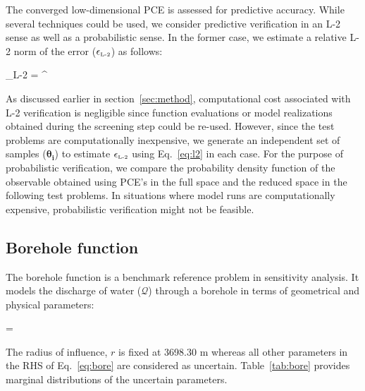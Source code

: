 The converged low-dimensional PCE is assessed
for predictive accuracy. While several techniques could be used, we consider predictive verification
in an L-2 sense as well as a probabilistic sense. In the former case, we estimate a relative L-2 norm
of the error ($\epsilon_{\mbox{\tiny{L-2}}}$) as follows:

\be
\epsilon_{\mbox{\tiny{L-2}}} = 
{\left[\sum_{i=1}^N
\left(\mathcal{Y}^{\mbox{\tiny M}}(\bm{\theta}_i)\right)^2\right]^{}}
\label{eq:l2}
\ee

\noindent As discussed earlier in section~\ref{sec:method}, computational cost associated with
L-2 verification is negligible since function evaluations or model realizations obtained during the
screening step could be re-used.
However, since the test problems are computationally inexpensive, we generate an independent
set of samples ($\bm{\theta_i}$) to estimate $\epsilon_{\mbox{\tiny{L-2}}}$ using Eq.~\ref{eq:l2}
in each case.
For the purpose of probabilistic verification, we compare the probability density function of
the observable obtained using PCE's in the full space and the reduced space in the following
test problems. In situations where model runs are computationally expensive, probabilistic verification might
not be feasible. 

\subsection{Borehole function}

The borehole function is a benchmark reference problem in sensitivity analysis. It models the discharge
of water ($\mathcal{Q}$) through a borehole in terms of geometrical and physical parameters:

\be
{} = 
\label{eq:bore}
\ee

\noindent The radius of influence, $r$ is fixed at 3698.30 m whereas all other parameters
in the RHS of Eq.~\ref{eq:bore} are considered as uncertain. Table~\ref{tab:bore} provides
marginal distributions of the uncertain parameters. 


